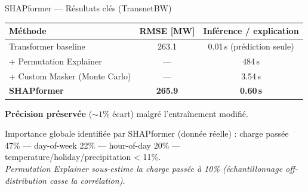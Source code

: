 \documentclass[10pt]{beamer}
\begin{document}
\begin{frame}{SHAPformer — Résultats clés (TransnetBW)}
  \begin{tcolorbox}[colback=blue!3, colframe=blue!50!black, arc=2mm,
                    fonttitle=\bfseries, title=Performance prédictive et coût d'explication]
    \centering
    \begin{tabular}{lcc}
      \toprule
      \textbf{Méthode} & \textbf{RMSE [MW]} & \textbf{Inférence / explication} \\
      \midrule
      Transformer baseline & 263.1 & 0.01\,s (prédiction seule) \\
      \quad + Permutation Explainer & — & 484\,s \\
      \quad + Custom Masker (Monte Carlo) & — & 3.54\,s \\
      \textbf{SHAPformer} & \textbf{265.9} & \textbf{0.60\,s} \\
      \bottomrule
    \end{tabular}
    \vspace{4pt}
    {\footnotesize \textbf{Précision préservée} ($\sim 1\%$ écart) malgré l'entraînement modifié.}
  \end{tcolorbox}

  \vspace{6pt}

  \begin{tcolorbox}[colback=green!3, colframe=green!50!black, arc=2mm,
                    fonttitle=\bfseries, title=Insights métier (TransnetBW)]
    Importance globale identifiée par SHAPformer (donnée réelle) :
    charge passée 47\% — day-of-week 22\% — hour-of-day 20\% — temperature/holiday/precipitation < 11\%.\\
    \emph{Permutation Explainer sous-estime la charge passée à 10\% (échantillonnage off-distribution casse la corrélation).}
  \end{tcolorbox}
\end{frame}
\end{document}

